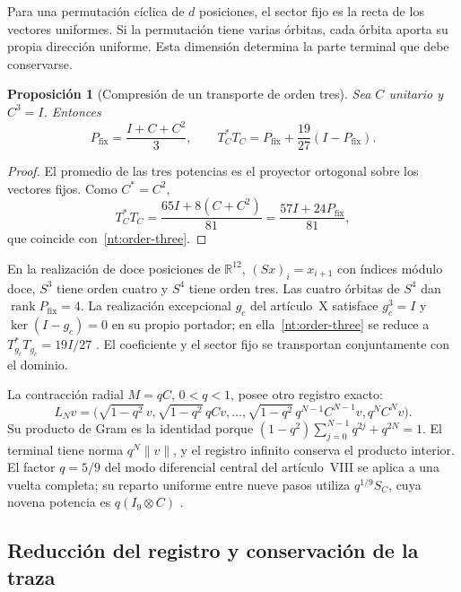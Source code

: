 \documentclass[a4paper,10pt]{article}
\newtheorem{proposition}[theorem]{Proposición}
\theoremstyle{definition}\newtheorem{definition}[theorem]{Definición}
\theoremstyle{remark}\newtheorem{remark}[theorem]{Observación}
\numberwithin{equation}{section}
\begin{document}
Para una permutación cíclica de \(d\) posiciones, el sector fijo
es la recta de los vectores uniformes. Si la permutación tiene
varias órbitas, cada órbita aporta su propia dirección uniforme.
Esta dimensión determina la parte terminal que debe conservarse.

\begin{proposition}[Compresión de un transporte de orden tres]
Sea \(C\) unitario y \(C^3=I\). Entonces
\begin{equation}
 P_{\mathrm{fix}}=\frac{I+C+C^2}{3},
 \qquad
 T_C^*T_C=P_{\mathrm{fix}}+
 \frac{19}{27}(I-P_{\mathrm{fix}}).
 \label{nt:order-three}
\end{equation}
\end{proposition}

\begin{proof}
El promedio de las tres potencias es el proyector ortogonal
sobre los vectores fijos. Como \(C^*=C^2\),
\[
 T_C^*T_C=\frac{65I+8(C+C^2)}{81}
 =\frac{57I+24P_{\mathrm{fix}}}{81},
\]
que coincide con~\eqref{nt:order-three}.
\end{proof}

En la realización de doce posiciones de
\(\mathbb R^{12}\), \((Sx)_i=x_{i+1}\) con índices módulo
doce, \(S^3\) tiene orden cuatro y \(S^4\) tiene orden tres.
Las cuatro órbitas de \(S^4\) dan
\(\operatorname{rank}P_{\mathrm{fix}}=4\).
La realización excepcional \(g_c\) del artículo~X satisface
\(g_c^3=I\) y \(\ker(I-g_c)=0\) en su propio portador;
en ella~\eqref{nt:order-three} se reduce a
\(T_{g_c}^*T_{g_c}=19I/27\)
\cite{hmtX}. El coeficiente y el sector fijo se transportan
conjuntamente con el dominio.

La contracción radial \(M=qC\), \(0<q<1\), posee otro registro
exacto:
\begin{equation}
 L_Nv=\bigl(\sqrt{1-q^2}\,v,
 \sqrt{1-q^2}\,qCv,\ldots,
 \sqrt{1-q^2}\,q^{N-1}C^{N-1}v,q^NC^Nv\bigr).
 \label{nt:radial-record}
\end{equation}
Su producto de Gram es la identidad porque
\((1-q^2)\sum_{j=0}^{N-1}q^{2j}+q^{2N}=1\).
El terminal tiene norma \(q^N\|v\|\), y el registro infinito
conserva el producto interior. El factor \(q=5/9\) del modo
diferencial central del artículo~VIII se aplica a una vuelta
completa; su reparto uniforme entre nueve pasos utiliza
\(q^{1/9}S_C\), cuya novena potencia es
\(q(I_9\otimes C)\) \cite{HMT-VIII}.

\subsection{Reducción del registro y conservación de la traza}
\end{document}
